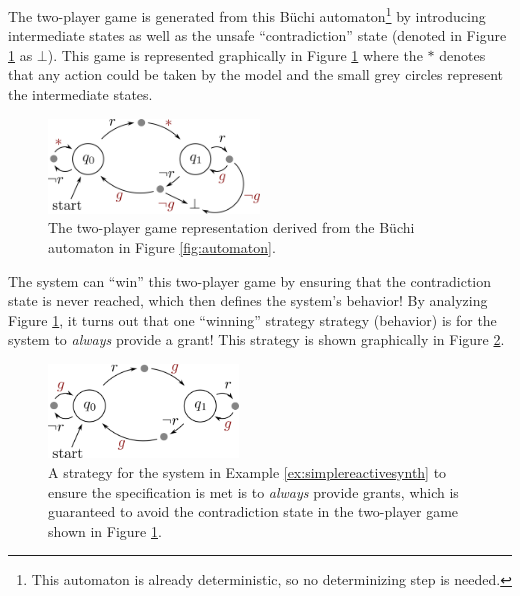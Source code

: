 \begin{example}
The two-player game is generated from this B\"{u}chi automaton\footnote{This automaton is already deterministic, so no determinizing step is needed.} by introducing intermediate states as well as the unsafe ``contradiction'' state (denoted in Figure \ref{fig:synthesis_2pgame} as $\bot$). This game is represented graphically in Figure \ref{fig:synthesis_2pgame} where the $*$ denotes that any action could be taken by the model and the small grey circles represent the intermediate states.
\begin{figure}[ht]
\begin{center}
\includegraphics[width=0.5\textwidth]{tex/figs/ch25_figs/game.png}
\caption{The two-player game representation derived from the B\"{u}chi automaton in Figure \ref{fig:automaton}.}
\label{fig:synthesis_2pgame}
\end{center}
\end{figure}
The system can ``win'' this two-player game by ensuring that the contradiction state is never reached, which then defines the system's behavior! By analyzing Figure \ref{fig:synthesis_2pgame}, it turns out that one ``winning'' strategy strategy (behavior) is for the system to \textit{always} provide a grant! This strategy is shown graphically in Figure \ref{fig:synthesis_2pgamesol}.
\begin{figure}[ht]
\begin{center}
\includegraphics[width=0.45\textwidth]{tex/figs/ch25_figs/game_solution.png}
\caption{A strategy for the system in Example \ref{ex:simplereactivesynth} to ensure the specification is met is to \textit{always} provide grants, which is guaranteed to avoid the contradiction state in the two-player game shown in Figure \ref{fig:synthesis_2pgame}.}
\label{fig:synthesis_2pgamesol}
\end{center}
\end{figure}
\end{example}